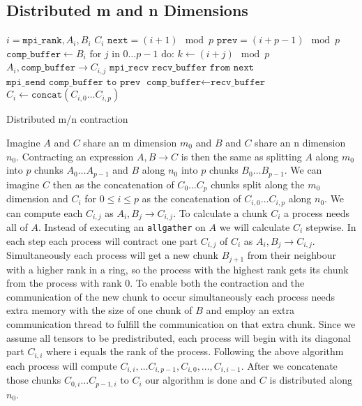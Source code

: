\subsection{Distributed m and n Dimensions}

\begin{algorithm}[ht]
        \begin{algorithmic}
        \Require $i = \texttt{mpi\_rank}, A_i, B_i$
        \Ensure $C_i$
        \State $\texttt{next} = (i+1) \mod p$
        \State $\texttt{prev} = (i+p-1) \mod p$
        \State $\texttt{comp\_buffer} \gets B_i$
        \State  $\text{for } j \text{ in } 0\dots p - 1 \text{ do:}$
        \State \indent $k \gets (i + j) \mod p$
        \State \indent {}
        \State \indent \indent $A_i, \texttt{comp\_buffer} \rightarrow C_{i,j}$
        \State \indent \indent $\texttt{mpi\_recv recv\_buffer from next}$
        \State \indent \indent $\texttt{mpi\_send comp\_buffer to prev}$
        \State \indent $\texttt{comp\_buffer} \gets \texttt{recv\_buffer}$
        \State $C_i \gets \texttt{concat}(C_{i,0}\dots C_{i,p})$
    \end{algorithmic}
    \caption{Distributed m/n contraction}
    \label{alg:m_n_pseudocode}
\end{algorithm}


Imagine $A$ and $C$ share an m dimension $m_0$ and $B$ and $C$ share an n dimension $n_0$.
Contracting an expression $A,B \rightarrow C$ is then the same as splitting $A$ along $m_0$ into $p$ chunks $A_0\dots A_{p-1}$ and $B$ along $n_0$ into $p$ chunks $B_0\dots B_{p-1}$.
We can imagine $C$ then as the concatenation of $C_0\dots C_p$ chunks split along the $m_0$ dimension and $C_i$ for $0 \leq i \leq p$ as the concatenation of $C_{i,0} \dots C_{i,p}$ along $n_0$.
We can compute each $C_{i,j}$ as $A_i,B_j \rightarrow C_{i,j}$.
To calculate a chunk $C_i$ a process needs all of $A$.
Instead of executing an \texttt{allgather} on $A$ we will calculate $C_i$ stepwise.
In each step each process will contract one part $C_{i,j}$ of $C_i$ as $A_i,B_j \rightarrow C_{i,j}$.
Simultaneously each process will get a new chunk $B_{j+1}$ from their neighbour with a higher rank in a ring, so the process with the highest rank gets its chunk from the process with rank 0.
To enable both the contraction and the communication of the new chunk to occur simultaneously each process needs extra memory with the size of one chunk of $B$ and employ an extra communication thread to fulfill the communication on that extra chunk.
Since we assume all tensors to be predistributed, each process will begin with its diagonal part $C_{i,i}$ where i equals the rank of the process.
Following the above algorithm each process will compute $C_{i,i}, \dots C_{i,p-1},C_{i,0},\dots,C_{i,i-1}$.
After we concatenate those chunks $C_{0,i}\dots C_{p-1,i}$ to $C_i$ our algorithm is done and $C$ is distributed along $n_0$.

